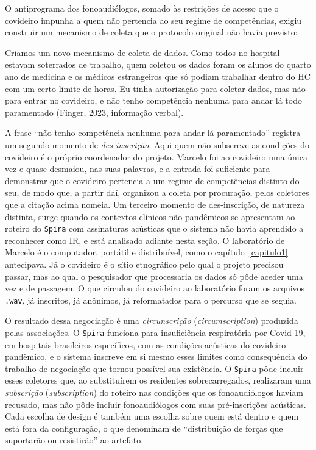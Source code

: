 O antiprograma dos fonoaudiólogos, somado às restrições de acesso que o covideiro impunha a quem não pertencia ao seu regime de competências, exigiu construir um mecanismo de coleta que o protocolo original não havia previsto:

\begin{citacaoabnt}
Criamos um novo mecanismo de coleta de dados. Como todos no hospital estavam soterrados de trabalho, quem coletou os dados foram os alunos do quarto ano de medicina e os médicos estrangeiros que só podiam trabalhar dentro do HC com um certo limite de horas. Eu tinha autorização para coletar dados, mas não para entrar no covideiro, e não tenho competência nenhuma para andar lá todo paramentado (Finger, 2023, informação verbal).
\end{citacaoabnt}

A frase \enquote{não tenho competência nenhuma para andar lá paramentado} registra um segundo momento de \textit{des-inscrição}. Aqui quem não subscreve as condições do covideiro é o próprio coordenador do projeto. Marcelo foi ao covideiro uma única vez e quase desmaiou, nas suas palavras, e a entrada foi suficiente para demonstrar que o covideiro pertencia a um regime de competências distinto do seu, de modo que, a partir daí, organizou a coleta por procuração, pelos coletores que a citação acima nomeia. Um terceiro momento de des-inscrição, de natureza distinta, surge quando os contextos clínicos não pandêmicos se apresentam ao roteiro do \texttt{Spira} com assinaturas acústicas que o sistema não havia aprendido a reconhecer como IR, e está analisado adiante nesta seção. O laboratório de Marcelo é o computador, portátil e distribuível, como o capítulo~\ref{capitulo1} antecipava. Já o covideiro é o sítio etnográfico pelo qual o projeto precisou passar, mas ao qual o pesquisador que processaria os dados só pôde aceder uma vez e de passagem. O que circulou do covideiro ao laboratório foram os arquivos \texttt{.wav}, já inscritos, já anônimos, já reformatados para o percurso que se seguia.

O resultado dessa negociação é uma \textit{circunscrição} (\textit{circumscription}) produzida pelas associações. O \texttt{Spira} funciona para insuficiência respiratória por Covid-19, em hospitais brasileiros específicos, com as condições acústicas do covideiro pandêmico, e o sistema inscreve em si mesmo esses limites como consequência do trabalho de negociação que tornou possível sua existência. O \texttt{Spira} pôde incluir esses coletores que, ao substituírem os residentes sobrecarregados, realizaram uma \textit{subscrição} (\textit{subscription}) do roteiro nas condições que os fonoaudiólogos haviam recusado, mas não pôde incluir fonoaudiólogos com suas pré-inscrições acústicas. Cada escolha de design é também uma escolha sobre quem está dentro e quem está fora da configuração, o que \textcite{AkrichCallonLatour2002} denominam de \enquote{distribuição de forças que suportarão ou resistirão} ao artefato.

